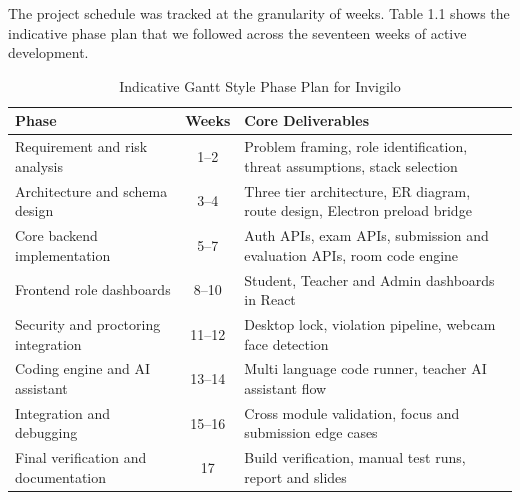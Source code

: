 \documentclass[12pt, a4paper]{report}
\begin{document}
\begin{justify}
  {\fontsize{12}{18}\selectfont
    The project schedule was tracked at the granularity of weeks. Table 1.1 shows the indicative phase plan that we followed across the seventeen weeks of active development.
  }
\end{justify}

\begin{table}[H]
  \caption{Indicative Gantt Style Phase Plan for Invigilo}
  \label{tab:1.1}
  \centering
  {\fontsize{11}{14}\selectfont
    \begin{tabular}{|p{1.2in}|c|p{3in}|}
      \hline
      \textbf{Phase} & \textbf{Weeks} & \textbf{Core Deliverables} \\
      \hline
      Requirement and risk analysis & 1--2 & Problem framing, role identification, threat assumptions, stack selection \\
      \hline
      Architecture and schema design & 3--4 & Three tier architecture, ER diagram, route design, Electron preload bridge \\
      \hline
      Core backend implementation & 5--7 & Auth APIs, exam APIs, submission and evaluation APIs, room code engine \\
      \hline
      Frontend role dashboards & 8--10 & Student, Teacher and Admin dashboards in React \\
      \hline
      Security and proctoring integration & 11--12 & Desktop lock, violation pipeline, webcam face detection \\
      \hline
      Coding engine and AI assistant & 13--14 & Multi language code runner, teacher AI assistant flow \\
      \hline
      Integration and debugging & 15--16 & Cross module validation, focus and submission edge cases \\
      \hline
      Final verification and documentation & 17 & Build verification, manual test runs, report and slides \\
      \hline
    \end{tabular}
  }
\end{table}
\end{document}
